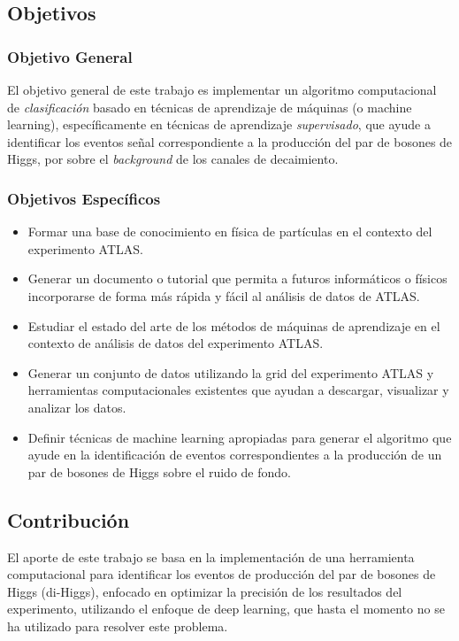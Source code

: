 \subsection{Objetivos}

\subsubsection{Objetivo General}

El objetivo general de este trabajo es implementar un algoritmo computacional de \textit{clasificación} basado en técnicas de aprendizaje de máquinas (o machine learning), específicamente en técnicas de aprendizaje \textit{supervisado}, que ayude a identificar los eventos señal correspondiente a la producción del par de bosones de Higgs, por sobre el \emph{background} de los canales de decaimiento.


\subsubsection{Objetivos Específicos}

\begin{itemize}
    \item Formar una base de conocimiento en física de partículas en el contexto del experimento ATLAS.
    \item Generar un documento o tutorial que permita a futuros informáticos o físicos incorporarse de forma más rápida y fácil al análisis de datos de ATLAS.
    \item Estudiar el estado del arte de los métodos de máquinas de aprendizaje en el contexto de análisis de datos del experimento ATLAS.
    \item Generar un conjunto de datos utilizando la grid del experimento ATLAS y herramientas computacionales existentes que ayudan a descargar, visualizar y analizar los datos.
    \item Definir técnicas de machine learning apropiadas para generar el algoritmo que ayude en la identificación de eventos correspondientes a la producción de un par de bosones de Higgs sobre el ruido de fondo.
\end{itemize}

\subsection{Contribución}

El aporte de este trabajo se basa en la implementación de una herramienta computacional para identificar los eventos de producción del par de bosones de Higgs (di-Higgs), enfocado en optimizar la precisión de los resultados del experimento, utilizando el enfoque de deep learning, que hasta el momento no se ha utilizado para resolver este problema.

